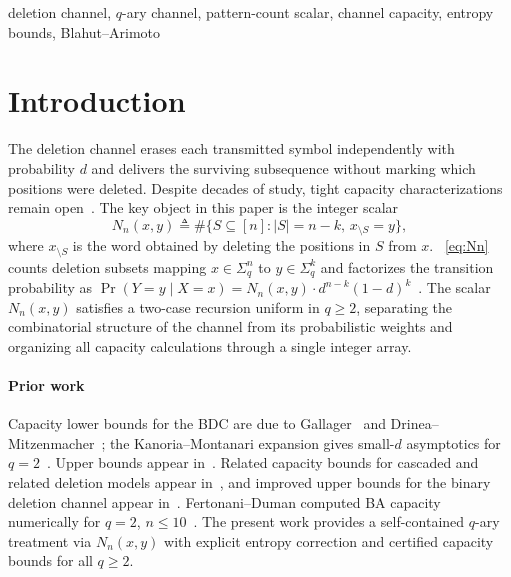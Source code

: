\documentclass[conference]{IEEEtran}
\begin{document}
\begin{IEEEkeywords}
deletion channel, \(q\)-ary channel, pattern-count scalar,
channel capacity, entropy bounds, Blahut--Arimoto
\end{IEEEkeywords}

\section{Introduction}
\label{sec:intro}

The deletion channel erases each transmitted symbol independently with
probability $d$ and delivers the surviving subsequence without marking
which positions were deleted. Despite decades of study, tight capacity
characterizations remain open~\cite{mitzenmacher2009}.
The key object in this paper is the integer scalar
\begin{equation}
  N_n(x,y)\triangleq \#\bigl\{S\subseteq[n]:|S|=n-k,\,x_{\setminus S}=y\bigr\},
  \label{eq:Nn}
\end{equation}
where $x_{\setminus S}$ is the word obtained by deleting the positions in $S$ from $x$. 
~\eqref{eq:Nn} counts deletion subsets mapping $x\in\Sigma_q^n$ to
$y\in\Sigma_q^k$ and factorizes the transition probability as
$\Pr(Y=y\mid X=x)=N_n(x,y)\cdot d^{n-k}(1-d)^k$~\cite{mitzenmacher2009}.
The scalar $N_n(x,y)$ satisfies a two-case recursion uniform in $q\ge 2$,
separating the combinatorial structure of the channel from its
probabilistic weights and organizing all capacity calculations through
a single integer array.

\paragraph*{Prior work}
Capacity lower bounds for the BDC are due to Gallager~\cite{gallager1961}
and Drinea--Mitzenmacher~\cite{drinea2007,mitzenmacher2006}; the
Kanoria--Montanari expansion gives small-$d$ asymptotics for
$q=2$~\cite{kanoria2013}. Upper bounds appear in~\cite{dalai2011,rahmati2014}.
Related capacity bounds for cascaded and related deletion models appear
in~\cite{tavakoli2022}, and improved upper bounds for the binary deletion
channel appear in~\cite{tavakoli2021}.
Fertonani--Duman computed BA capacity numerically for $q=2$,
$n\le 10$~\cite{fertonani2010}. The present work provides a
self-contained $q$-ary treatment via $N_n(x,y)$ with explicit
entropy correction and certified capacity bounds for all $q\ge 2$.
\end{document}
